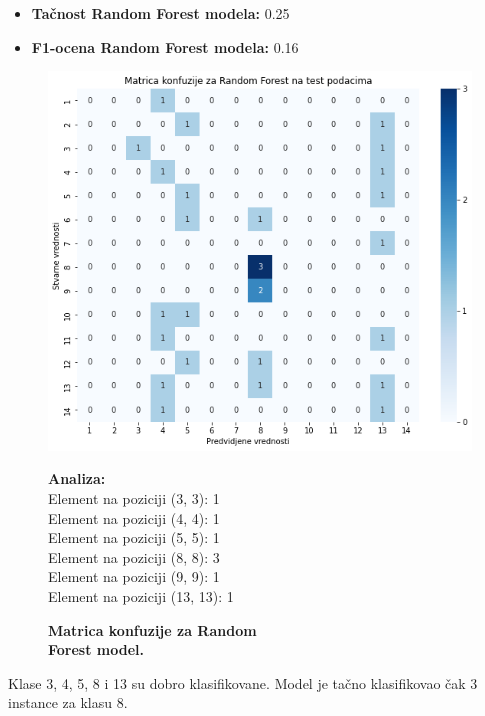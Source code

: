 \documentclass{article}
\begin{document}
\begin{itemize}
    \item \textbf{Tačnost Random Forest modela:} 0.25
    \item \textbf{F1-ocena Random Forest modela:} 0.16
\end{itemize}


\begin{figure}[ht]
    \begin{minipage}{0.5\textwidth}
        \centering
        \includegraphics[width=\linewidth]{forestconf.png}
        \captionsetup{justification=centering}
        \caption*{\textbf{Matrica konfuzije za Random \\Forest model.}}
        \label{fig:nedostajuce}
    \end{minipage}%
    \begin{minipage}{0.5\textwidth}
        \textbf{Analiza:}\\
        
        \vspace{1mm}
        Element na poziciji (3, 3): 1\\
        Element na poziciji (4, 4): 1\\
        Element na poziciji (5, 5): 1\\
        Element na poziciji (8, 8): 3\\
        Element na poziciji (9, 9): 1\\
        Element na poziciji (13, 13): 1\\
    \end{minipage}
\end{figure}
\begin{flushleft}

Klase 3, 4, 5, 8 i 13 su dobro klasifikovane. Model je tačno klasifikovao čak 3 instance za klasu 8.

\end{flushleft}
\newpage
\end{document}
